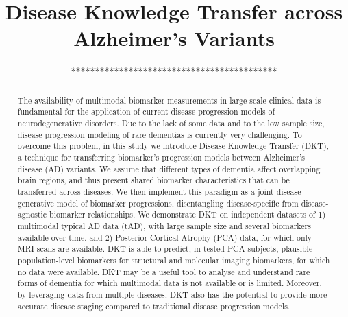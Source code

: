 \documentclass{llncs}
\begin{document}

\title{Disease Knowledge Transfer across Alzheimer's Variants}
%
%

% 
% 

\author{*******************************************}

\institute{***************************************}


\maketitle              %

\begin{abstract}
The availability of multimodal biomarker measurements in large scale clinical data is fundamental for the application of current disease progression models of neurodegenerative disorders. Due to the lack of some data and to the low sample size, disease progression modeling of rare dementias is currently very challenging. To overcome this problem, in this study we introduce Disease Knowledge Transfer (DKT), a technique for transferring biomarker's progression models between Alzheimer's disease (AD) variants. We assume that different types of dementia affect overlapping brain regions, and thus present shared biomarker characteristics that can be transferred across diseases. We then implement this paradigm as a joint-disease generative model of biomarker progressions, disentangling disease-specific from  disease-agnostic biomarker relationships. We demonstrate DKT on independent datasets of 1) multimodal typical AD data (tAD), with large sample size and several biomarkers available over time, and 2) Posterior Cortical Atrophy (PCA) data, for which only MRI scans are available. DKT is able to predict, in tested PCA subjects, plausible population-level biomarkers for structural and molecular imaging biomarkers, for which no data were available. DKT may be a useful tool to analyse and understand rare forms of dementia for which multimodal data is not available or is limited. Moreover, by leveraging data from multiple diseases, DKT also has the potential to provide more accurate disease staging compared to traditional disease progression models.


\end{abstract}
\end{document}
